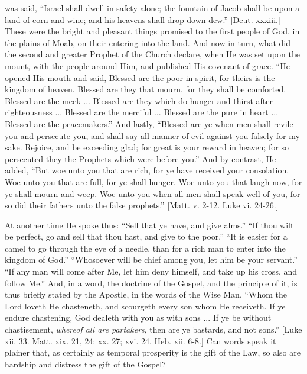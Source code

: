 was said, ``Israel shall dwell in safety alone; the fountain of
Jacob shall be upon a land of corn and wine; and his heavens shall
drop down dew.'' [Deut. xxxiii.] These were the bright and
pleasant things promised to the first people of God, in the plains of
Moab, on their entering into the land. And now in turn, what did the
second and greater Prophet of the Church declare, when He was set upon
the mount, with the people around Him, and published His covenant of
grace. ``He opened His mouth and said, Blessed are the poor in
spirit, for theirs is the kingdom of heaven. Blessed are they that
mourn, for they shall be comforted. Blessed are the meek ... Blessed
are they which do hunger and thirst after righteousness ... Blessed
are the merciful ... Blessed are the pure in heart ... Blessed are the
peacemakers.'' And lastly, ``Blessed are ye when men shall
revile you and persecute you, and shall say all manner of evil against
you falsely for my sake. Rejoice, and be exceeding glad; for great is
your reward in heaven; for so persecuted they the Prophets which were
before you.'' And by contrast, He added, ``But woe unto you
that are rich, for ye have received your consolation. Woe unto you
that are full, for ye shall hunger. Woe unto you that laugh now, for
ye shall mourn and weep. Woe unto you when all men shall speak well of
you, for so did their fathers unto the false prophets.'' [Matt. v.
2-12. Luke vi. 24-26.]

At another time He spoke thus: ``Sell that ye have, and give
alms.'' ``If thou wilt be perfect, go and sell that thou hast,
and give to the poor.'' ``It is easier for a camel to go
through the eye of a needle, than for a rich man to enter into the
kingdom of God.'' ``Whosoever will be chief among you, let him
be your servant.'' ``If any man will come after Me, let him
deny himself, and take up his cross, and follow Me.'' And, in a
word, the doctrine of the Gospel, and the principle of it, is thus
briefly stated by the Apostle, in the words of the Wise Man.
``Whom the Lord loveth He chasteneth, and scourgeth every son whom
He receiveth. If ye endure chastening, God dealeth with you as with
sons ... If ye be without chastisement, \emph{whereof all are partakers},
then are ye bastards, and not sons.'' [Luke xii. 33. Matt. xix.
21, 24; xx. 27; xvi. 24. Heb. xii. 6-8.] Can words speak it plainer
that, as certainly as temporal prosperity is the gift of the Law, so
also are hardship and distress the gift of the Gospel?


